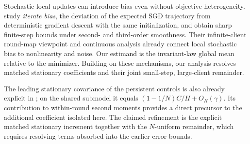 Stochastic local updates can introduce bias even without objective
heterogeneity. \citet{glasgow2022sharp} study \emph{iterate bias}, the
deviation of the expected SGD trajectory from deterministic gradient
descent with the same initialization, and obtain sharp finite-step bounds
under second- and third-order smoothness. Their infinite-client round-map
viewpoint and continuous analysis already connect local stochastic bias
to nonlinearity and noise. Our estimand is the invariant-law global mean
relative to the minimizer. Building on these mechanisms, our analysis
resolves matched stationary coefficients and their joint small-step,
large-client remainder.

The leading stationary covariance of the persistent controls is also
already explicit in \citet[Lemma~5.1]{mangold2025scaffold}; on the shared
submodel it equals $(1-1/N)C/H+O_H(\gamma)$. Its contribution to
within-round second moments provides a direct precursor to the additional
coefficient isolated here. The claimed refinement is the explicit
matched stationary increment together with the $N$-uniform remainder,
which requires resolving terms absorbed into the earlier error bounds.

